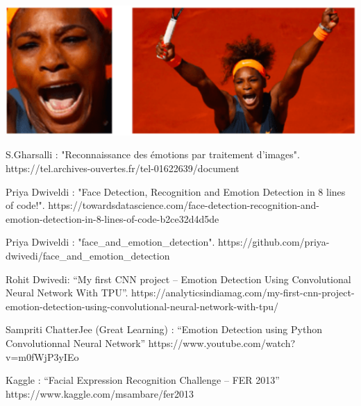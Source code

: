 \documentclass[a4paper, 10pt, conference]{ieeeconf}      %
\begin{document}
\begin{center}
\includegraphics[scale=0.5]{Williams}
\label{fig12}
\end{center}


\begin{thebibliography}{99}

S.Gharsalli : "Reconnaissance des émotions par traitement d’images". https://tel.archives-ouvertes.fr/tel-01622639/document

Priya Dwiveldi : "Face Detection, Recognition and Emotion Detection in 8 lines of code!". https://towardsdatascience.com/face-detection-recognition-and-emotion-detection-in-8-lines-of-code-b2ce32d4d5de

Priya Dwiveldi : "face\_and\_emotion\_detection". https://github.com/priya-dwivedi/face\_and\_emotion\_detection

Rohit Dwivedi: “My first CNN project – Emotion Detection Using Convolutional Neural Network With TPU”.  https://analyticsindiamag.com/my-first-cnn-project-emotion-detection-using-convolutional-neural-network-with-tpu/

Sampriti ChatterJee (Great Learning) : “Emotion Detection using Python Convolutionnal Neural Network” https://www.youtube.com/watch?v=m0fWjP3yIEo

Kaggle : “Facial Expression Recognition Challenge – FER 2013”  https://www.kaggle.com/msambare/fer2013

\end{thebibliography}

\listoffigures
\end{document}
